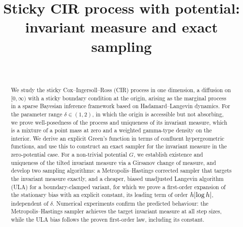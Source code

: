 \documentclass[aap,preprint]{imsart}
\DeclarePairedDelimiter{\vpair}{|}{|} %
\newcommand\abs[2][0pt]{\vpair*{#2}} %
\numberwithin{equation}{section}
\theoremstyle{plain}
\theoremstyle{definition}
\begin{document}
\begin{frontmatter}

\title{Sticky CIR process with potential: invariant measure and exact sampling}

\begin{aug}
\author{~}
\address{Department of Mathematical Sciences,
University of Bath,
Bath BA2 7AY,
United Kingdom.
}
\end{aug}

\begin{abstract}
We study the sticky Cox--Ingersoll--Ross (CIR) process in one dimension,
a diffusion on $[0,\infty)$ with a sticky boundary condition at the origin,
arising as the marginal process in a sparse Bayesian inference framework
based on Hadamard--Langevin dynamics. For the parameter range $\delta\in(1,2)$,
in which the origin is accessible but not absorbing, we prove well-posedness
of the process and uniqueness of its invariant measure, which is a mixture
of a point mass at zero and a weighted gamma-type density on the interior.
We derive an explicit Green's function in terms of
confluent hypergeometric functions, and use this to construct an exact
sampler for the invariant measure in the zero-potential case. For a
non-trivial potential $G$, we establish existence and uniqueness of the
tilted invariant measure via a Girsanov change of measure, and develop
two sampling algorithms: a Metropolis--Hastings corrected sampler that
targets the invariant measure exactly, and a cheaper, biased unadjusted Langevin
algorithm (ULA) for a boundary-clamped variant, for which we prove a first-order
expansion of the stationary bias with an explicit constant, its leading term of
order $h\abs{\log h } $, independent of $\delta$.
Numerical experiments confirm the predicted behaviour: the Metropolis--Hastings sampler achieves the target invariant measure at all step sizes, while the ULA bias follows the proven first-order law, including its constant.
\end{abstract}

\begin{keyword}[class=MSC2020]
\end{keyword}

\begin{keyword}
\end{keyword}

\end{frontmatter}
\end{document}
